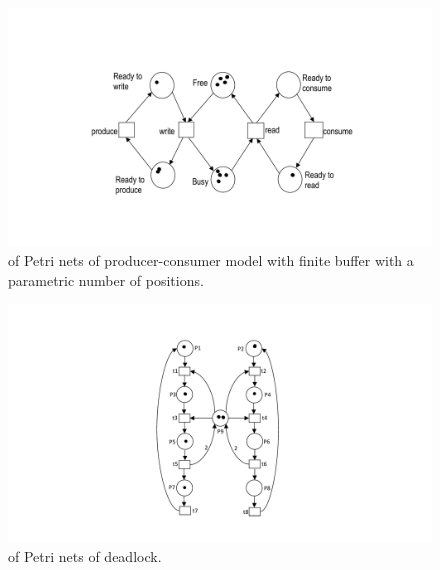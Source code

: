 \newpage

\begin{figure}[!htp]
    \centering
    \includegraphics[width=.9\textwidth]{img/petri-nets-3.pdf}
    \caption{ of Petri nets of producer-consumer model with finite buffer with a parametric number of positions.}
\end{figure}

\begin{figure}[!htp]
    \centering
    \includegraphics[width=.6\textwidth]{img/petri-nets-4.pdf}
    \caption{ of Petri nets of deadlock.}
\end{figure}